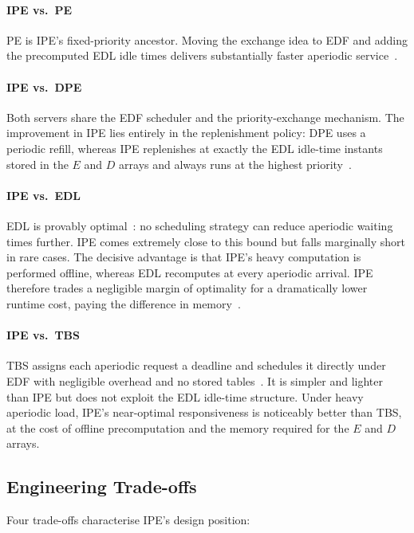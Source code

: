 \documentclass[conference]{IEEEtran}
\begin{document}
\paragraph{IPE vs.\ PE} PE is IPE's fixed-priority ancestor.
Moving the exchange idea to EDF and adding the precomputed
EDL idle times delivers substantially faster aperiodic
service~\cite{spuri1996}.

\paragraph{IPE vs.\ DPE} Both servers share the EDF scheduler
and the priority-exchange mechanism. The improvement in IPE
lies entirely in the replenishment policy: DPE uses a periodic
refill, whereas IPE replenishes at exactly the EDL idle-time
instants stored in the $E$ and $D$ arrays and always runs at
the highest priority~\cite{spuri1996}.

\paragraph{IPE vs.\ EDL} EDL is provably optimal~\cite{spuri1994}:
no scheduling strategy can reduce aperiodic waiting times
further. IPE comes extremely close to this bound but falls
marginally short in rare cases. The decisive advantage is
that IPE's heavy computation is performed offline, whereas
EDL recomputes at every aperiodic arrival. IPE therefore
trades a negligible margin of optimality for a dramatically
lower runtime cost, paying the difference in
memory~\cite{buttazzo2011}.

\paragraph{IPE vs.\ TBS} TBS assigns each aperiodic request
a deadline and schedules it directly under EDF with negligible
overhead and no stored tables~\cite{buttazzo2011}. It is
simpler and lighter than IPE but does not exploit the EDL
idle-time structure. Under heavy aperiodic load, IPE's
near-optimal responsiveness is noticeably better than TBS, at
the cost of offline precomputation and the memory required
for the $E$ and $D$ arrays.

\subsection{Engineering Trade-offs}

Four trade-offs characterise IPE's design position:
\end{document}
